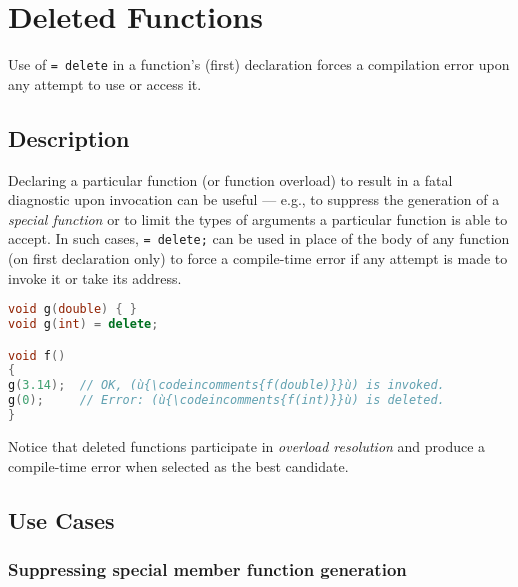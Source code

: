 \newpage
\section[Deleted Functions]{Deleted Functions}\label{deleted-functions}


Use of \texttt{=}~\texttt{delete} in a function's (first) declaration
forces a compilation error upon any attempt to use or access it.

\subsection[Description]{Description}\label{description}

Declaring a particular function (or function overload) to result in a
fatal diagnostic upon invocation can be useful --- e.g., to suppress the
generation of a \emph{special function} or to limit the types of
arguments a particular function is able to accept. In such cases,
\texttt{=}~\texttt{delete;} can be used in place of the body of any
function (on first declaration only) to force a compile-time error if
any attempt is made to invoke it or take its address.

\begin{lstlisting}[language=C++]
void g(double) { }
void g(int) = delete;

void f()
{
g(3.14);  // OK, (ù{\codeincomments{f(double)}}ù) is invoked.
g(0);     // Error: (ù{\codeincomments{f(int)}}ù) is deleted.
}
\end{lstlisting}

\noindent Notice that deleted functions participate in \emph{overload resolution}
and produce a compile-time error when selected as the best candidate.

\subsection[Use Cases]{Use Cases}\label{use-cases}

\subsubsection[Suppressing special member function generation]{Suppressing special member function generation}\label{suppressing-special-member-function-generation}

